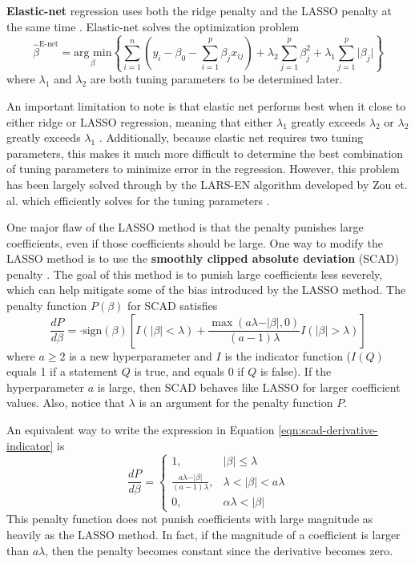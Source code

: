 \documentclass{article}
\newcommand{\argmin}[2]{\underset{#1}{\text{arg min}}\left\{#2\right\}}
\newcommand{\sign}{\text{sign}}
\begin{document}
\textbf{Elastic-net} regression uses both the ridge penalty and the LASSO penalty at the same time \cite{zou2005regularization}. Elastic-net solves the optimization problem
\begin{equation}
	\hat{\beta}^{\text{E-net}}=\argmin{\beta}{\sum\limits_{i = 1}^n \left( y_i - \beta_0 - \sum\limits_{i = 1}^p \beta_j x_{ij} \right) + \lambda_2\sum\limits_{j = 1}^p \beta_j^2 + \lambda_1\sum\limits_{j = 1}^p \vert \beta_j \vert}
\end{equation}
where $\lambda_1$ and $\lambda_2$ are both tuning parameters to be determined later.

An important limitation to note is that elastic net performs best when it close to either ridge or LASSO regression, meaning that either $\lambda_1$ greatly exceeds $\lambda_2$ or $\lambda_2$ greatly exceeds $\lambda_1$ \cite{zou2005regularization}. Additionally, because elastic net requires two tuning parameters, this makes it much more difficult to determine the best combination of tuning parameters to minimize error in the regression. However, this problem has been largely solved through by the LARS-EN algorithm developed by Zou et. al. which efficiently solves for the tuning parameters \cite{zou2005regularization}.

One major flaw of the LASSO method is that the penalty punishes large coefficients, even if those coefficients should be large. One way to modify the LASSO method is to use the \textbf{smoothly clipped absolute deviation} (SCAD) penalty \cite{fan2001variable}. The goal of this method is to punish large coefficients less severely, which can help mitigate some of the bias introduced by the LASSO method. The penalty function $P(\beta)$ for SCAD satisfies
\begin{equation}\label{eqn:scad-derivative-indicator}
	\frac{dP}{d\beta} = \cdot\sign(\beta)\left[ I(\vert \beta \vert<\lambda) + \frac{\max(a\lambda - \vert \beta\vert, 0)}{(a - 1)\lambda}I(\vert \beta \vert > \lambda) \right]
\end{equation}
where $a\geq 2$ is a new hyperparameter and $I$ is the indicator function ($I(Q)$ equals 1 if a statement $Q$ is true, and equals 0 if $Q$ is false). If the hyperparameter $a$ is large, then SCAD behaves like LASSO for larger coefficient values. Also, notice that $\lambda$ is an argument for the penalty function $P$.

An equivalent way to write the expression in Equation \ref{eqn:scad-derivative-indicator} is
\begin{equation}
	\frac{dP}{d\beta} = \left\{\begin{array}{ll}
		1,&\vert \beta \vert\leq \lambda\\
		\frac{a\lambda - \vert \beta \vert}{(a - 1)\lambda},&\lambda < \vert \beta \vert < a\lambda\\
		0,&\alpha\lambda < \vert \beta \vert
	\end{array}\right.
\end{equation}
This penalty function does not punish coefficients with large magnitude as heavily as the LASSO method. In fact, if the magnitude of a coefficient is larger than $a\lambda$, then the penalty becomes constant since the derivative becomes zero.
\end{document}
